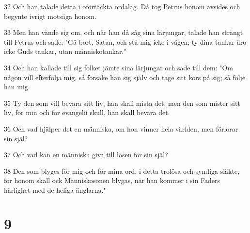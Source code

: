 \par 32 Och han talade detta i oförtäckta ordalag. Då tog Petrus honom avsides och begynte ivrigt motsäga honom.
\par 33 Men han vände sig om, och när han då såg sina lärjungar, talade han strängt till Petrus och sade: "Gå bort, Satan, och stå mig icke i vägen; ty dina tankar äro icke Guds tankar, utan människotankar."
\par 34 Och han kallade till sig folket jämte sina lärjungar och sade till dem: "Om någon vill efterfölja mig, så försake han sig själv och tage sitt kors på sig; så följe han mig.
\par 35 Ty den som vill bevara sitt liv, han skall mista det; men den som mister sitt liv, för min och för evangelii skull, han skall bevara det.
\par 36 Och vad hjälper det en människa, om hon vinner hela världen, men förlorar sin själ?
\par 37 Och vad kan en människa giva till lösen för sin själ?
\par 38 Den som blyges för mig och för mina ord, i detta trolösa och syndiga släkte, för honom skall ock Människosonen blygas, när han kommer i sin Faders härlighet med de heliga änglarna."

\chapter{9}

